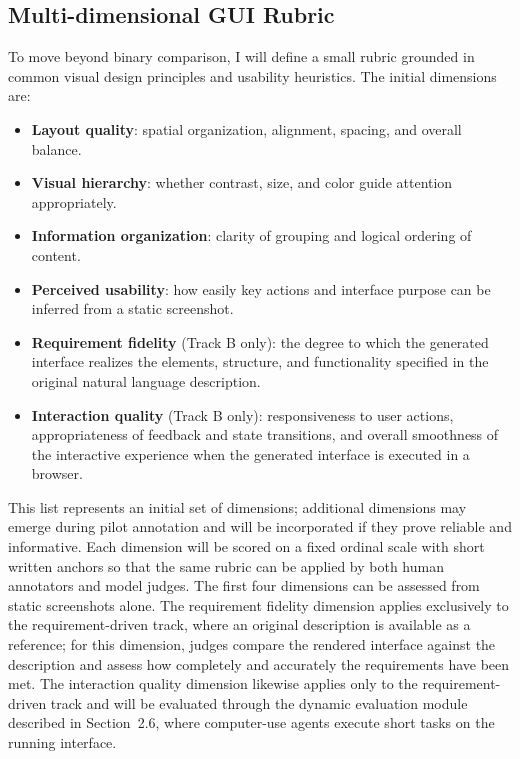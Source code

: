 \documentclass[pdflatex,sn-mathphys-num]{sn-jnl}
\begin{document}
\subsection{Multi-dimensional GUI Rubric}

To move beyond binary comparison, I will define a small rubric grounded in common
visual design principles and usability heuristics. The initial dimensions are:

\begin{itemize}
    \item \textbf{Layout quality}: spatial organization, alignment, spacing, and
    overall balance.
    \item \textbf{Visual hierarchy}: whether contrast, size, and color guide attention
    appropriately.
    \item \textbf{Information organization}: clarity of grouping and logical ordering
    of content.
    \item \textbf{Perceived usability}: how easily key actions and interface purpose
    can be inferred from a static screenshot.
    \item \textbf{Requirement fidelity} (Track B only): the degree to which the
    generated interface realizes the elements, structure, and functionality specified
    in the original natural language description.
    \item \textbf{Interaction quality} (Track B only): responsiveness to user actions,
    appropriateness of feedback and state transitions, and overall smoothness of the
    interactive experience when the generated interface is executed in a browser.
\end{itemize}

This list represents an initial set of dimensions; additional dimensions may emerge
during pilot annotation and will be incorporated if they prove reliable and
informative. Each dimension will be scored on a fixed ordinal scale with short written
anchors so that the same rubric can be applied by both human annotators and model
judges. The first four dimensions can be assessed from static screenshots alone. The
requirement fidelity dimension applies exclusively to the requirement-driven track,
where an original description is available as a reference; for this dimension, judges
compare the rendered interface against the description and assess how completely and
accurately the requirements have been met. The interaction quality dimension likewise
applies only to the requirement-driven track and will be evaluated through the dynamic
evaluation module described in Section~2.6, where computer-use agents execute short
tasks on the running interface.
\end{document}
